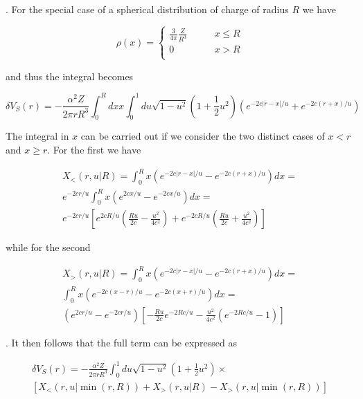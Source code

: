 \documentclass[]{report}
\begin{document}
. For the special case of a spherical distribution of charge of radius $R$ we have

\begin{equation}
\rho(x) = \begin{cases}
\frac{3}{4\pi}\frac{Z}{R^3} \qquad &x \leq R \\
0 \qquad &x > R \\
\end{cases}
\end{equation}

and thus the integral becomes

\begin{equation}\label{uehl_sphere}
\delta V_S(r) = -\frac{\alpha^2Z}{2\pi rR^3}\int_0^R dx x \int_0^1 du \sqrt{1-u^2}\left(1+\frac{1}{2}u^2\right)\left(e^{-2c|r-x|/u}+e^{-2c(r+x)/u}\right)
\end{equation}

The integral in $x$ can be carried out if we consider the two distinct cases of $x < r$ and $x \geq r$. For the first we have

\begin{multline}\label{intx_less}
X_{<}(r, u | R) = \int_0^R x \left(e^{-2c|r-x|/u}-e^{-2c(r+x)/u}\right)  dx = \\
e^{-2cr/u}\int_0^R x \left(e^{2cx/u}-e^{-2cx/u}\right)  dx = \\ e^{-2cr/u}\left[e^{2cR/u}\left(\frac{Ru}{2c}-\frac{u^2}{4c^2}\right)+e^{-2cR/u}\left(\frac{Ru}{2c}+\frac{u^2}{4c^2}\right)\right]
\end{multline}

while for the second

\begin{multline}\label{intx_more}
X_{>}(r, u | R) =\int_0^R x \left(e^{-2c|r-x|/u}-e^{-2c(r+x)/u}\right)  dx = \\
\int_0^R x \left(e^{-2c(x-r)/u}-e^{-2c(x+r)/u}\right)  dx = \\ \left(e^{2cr/u}-e^{-2cr/u}\right)\left[-\frac{Ru}{2c}e^{-2Rc/u}-\frac{u^2}{4c^2}(e^{-2Rc/u}-1)\right]
\end{multline}

. It then follows that the full term can be expressed as

\begin{multline}
\delta V_S(r) =  -\frac{\alpha^2Z}{2\pi rR^3}\int_0^1 du \sqrt{1-u^2}\left(1+\frac{1}{2}u^2\right) \times \\
\left[X_{<}(r, u | \min(r, R)) + X_{>}(r, u | R) -X_{>}(r, u | \min(r, R))\right]
\end{multline}
\end{document}
